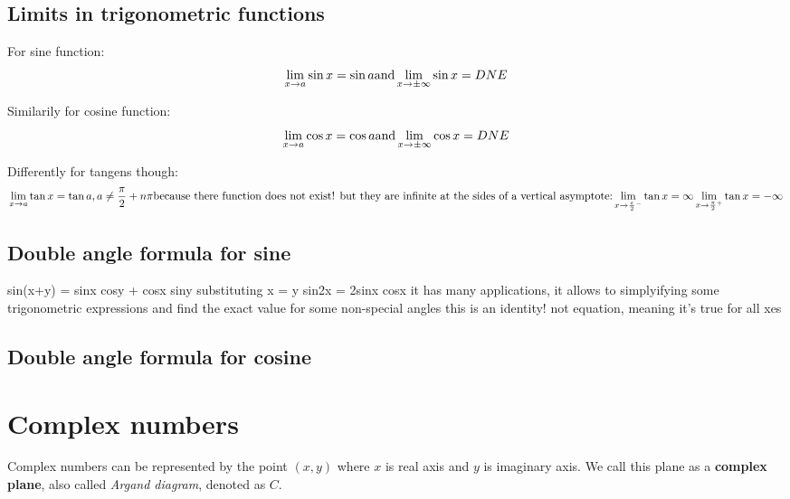 \documentclass{article}
\begin{document}
\subsection{Limits in trigonometric functions}
For sine function:
\begin{equation}
  \lim\limits_{x \to a}\sin x = \sin a \\
  \text{and}
  \lim\limits_{x \to \pm\infty}\sin x = DNE
\end{equation}

Similarily for cosine function:
\begin{equation}
  \lim\limits_{x \to a}\cos x = \cos a \\
  \text{and}
  \lim\limits_{x \to \pm\infty}\cos x = DNE
\end{equation}

Differently for tangens though:
\begin{equation}
  \lim\limits_{x \to a}\tan x = \tan a, a \neq \frac{\pi}{2} + n\pi \\
  \text{because there function does not exist! but they are infinite at the sides of a vertical asymptote:} \\
  \lim\limits_{x \to \frac{\pi}{2}^-}\tan x = \infty \\
  \lim\limits_{x \to \frac{\pi}{2}^+}\tan x = -\infty
\end{equation}

\subsection{Double angle formula for sine}
sin(x+y) = sinx cosy + cosx siny
substituting x = y
sin2x = 2sinx cosx
it has many applications, it allows to simplyifying some trigonometric expressions
and find the exact value for some non-special angles
this is an identity! not equation, meaning it's true for all xes
\subsection{Double angle formula for cosine}


\section{Complex numbers}
Complex numbers can be represented by the point $(x, y)$ where $x$ is real axis and $y$
is imaginary axis. We call this plane as a \textbf{complex plane}, also called
\textit{Argand diagram}, denoted as $C$.
\end{document}
